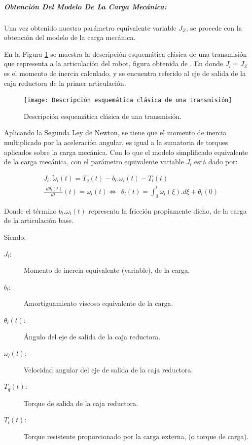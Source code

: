 \documentclass{article}
\begin{document}
\begin{sloppypar}
\hfill
\subparagraph{\textbf{Obtención Del Modelo De La Carga Mecánica:}}
\label{sec:Obtención Del Modelo De La Carga Mecánica}

\hfill

\hfill

Una vez obtenido nuestro parámetro equivalente variable $J_Z$, se procede con la obtención del modelo de la carga mecánica.

En la Figura \ref{fig:Descripción esquemática clásica de una transmisión} se muestra la descripción esquemática clásica de una transmisión que representa a la articulación del robot, figura obtenida de \cite{arenas2023virtual}. En donde $J_l=J_Z$ es el momento de inercia calculado, y se encuentra referido al eje de salida de la caja reductora de la primer articulación.

\begin{figure}[H]
    \centering
    \texttt{[image: Descripción esquemática clásica de una transmisión]}
    \caption{Descripción esquemática clásica de una transmisión.}
    \label{fig:Descripción esquemática clásica de una transmisión}
\end{figure}

Aplicando la Segunda Ley de Newton, se tiene que el momento de inercia multiplicado por la aceleración angular, es igual a la sumatoria de torques aplicados sobre la carga mecánica. Con lo que el modelo simplificado equivalente de la carga mecánica, con el parámetro equivalente variable $J_l$ está dado por:

\begin{subequations} \label{eq:J_l y theta_l}
    \begin{align}
        & \label{eq:J_l}         J_l.\ {\dot{\omega}}_l\left(t\right)=T_q\left(t\right)-b_l.\omega_l(t)-T_l(t)
        \\
        & \label{eq:theta_l(t)}     \frac{{\ \ d\theta}_l\left(t\right)}{dt}\left(t\right)=\omega_l\left(t\right)\Leftrightarrow{\ \ \theta}_l\left(t\right)=\int_{0}^{t}{\omega_l\left(\xi\right).d\xi}+\theta_l\left(0\right)
    \end{align}
\end{subequations}

Donde el término $b_l.\omega_l(t)$ representa la fricción propiamente dicho, de la carga de la articulación base.

Siendo:
\begin{description}
    \item[$J_l:$] Momento de inercia equivalente (variable), de la carga.
    \item[$b_l:$] Amortiguamiento viscoso equivalente de la carga.
    \item[$\theta_l(t):$] Ángulo del eje de salida de la caja reductora.
    \item[$\omega_l(t):$] Velocidad angular del eje de salida de la caja reductora.
    \item[$T_q(t):$] Torque de salida de la caja reductora.
    \item[$T_l(t):$] Torque resistente proporcionado por la carga externa, (o torque de carga).
\end{description}




\end{sloppypar}
\end{document}
